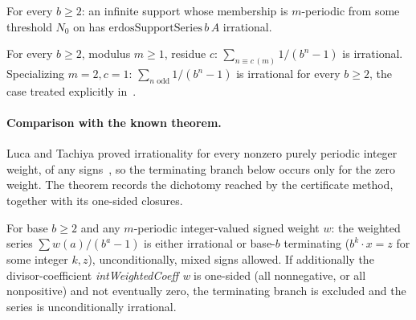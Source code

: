 \begin{thm}
\label{thm:eventually-periodic}
For every $b\ge 2$: an infinite support whose membership is $m$-periodic from some
threshold $N_0$ on has $\mathrm{erdosSupportSeries}\,b\,A$ irrational.
\par{}
\end{thm}

\begin{thm}
\label{thm:residue-odd}
For every $b\ge 2$, modulus $m\ge 1$, residue $c$: $\sum_{n\equiv c\,(m)} 1/(b^n-1)$ is
irrational. Specializing $m=2,c=1$: $\sum_{n\text{ odd}} 1/(b^n-1)$ is irrational for
every $b\ge 2$, the case treated explicitly in~\cite[Example~2, p.~140]{lucatachiya2017}.
\par{}
\end{thm}

\paragraph{Comparison with the known theorem.} Luca and Tachiya proved irrationality for every
nonzero purely periodic integer weight, of any signs~\cite[Theorem~A, p.~139]{lucatachiya2017}, so
the terminating branch below occurs only for the zero weight.  The theorem records the dichotomy
reached by the certificate method, together with its one-sided closures.

\begin{thm}
\label{thm:signed-periodic}
For base $b\ge 2$ and any $m$-periodic integer-valued signed weight $w$: the weighted
series $\sum w(a)/(b^a-1)$ is either irrational or base-$b$ terminating ($b^k\cdot x=z$
for some integer $k,z$), unconditionally, mixed signs allowed. If additionally the
divisor-coefficient \emph{intWeightedCoeff w} is one-sided (all nonnegative, or all
nonpositive) and not eventually zero, the terminating branch is excluded and the series
is unconditionally irrational.
\par{}
\end{thm}

